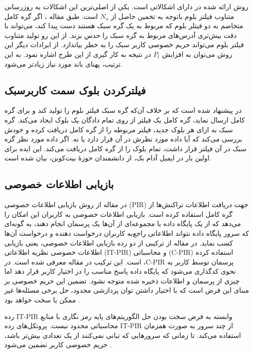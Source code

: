 روش ارائه شده در \cite{Kanemura2017} دارای اشکالاتی است. یکی از اصلی‌ترین این اشکالات به روزرسانی متناوب فیلتر بلوم باتوجه به تخمین حاصل از $N_u$  است. طبق مقاله \cite{Gervais2014}، اگر گره کامل متخاصم به دو فیتلر بلوم که مربوط به یک گره سبک هستند دست پیدا کند، می‌تواند با دقت بیش‌تری آدرس‌های مربوط به گره سبک را حدس بزند. از این رو تولید متناوب فیلتر بلوم می‌تواند حریم خصوصی کاربر سبک را به خطر بیاندازد.
از ایرادات دیگر این روش می‌توان به افزایش $P_t$ در نتیجه به کار گیری از این طرح اشاره نمود. به این ترتیب، پهنای باند مورد نیاز زیادتر می‌شود. 

\subsection{فیلترکردن بلوک سمت کاربرسبک}
\label{BIP157}
در \cite{Osuntokun2017} پیشنهاد شده است که بر خلاف آن‌که گره سبک فیلتر بلوم را تولید کند و برای گره کامل ارسال نماید، گره کامل یک فیلتر از روی تمام دادگان یک بلوک ایجاد می‌کند. گره سبک به ازای هر بلوک جدید، فیلتر مربوطه را از گره کامل دریافت کرده و خودش بررسی می‌کند که آیا داده مورد نظرش در آن قرار دارد یا نه. اگر داده مورد نظر گره سبک در آن فیلتر قرار داشت، تمام بلوک را از گره کامل دریافت می‌کند. این ایده برای اولین بار در ایمیل آدام بک، از دانشمندان حوزهٔ بیت‌کوین، بیان شده است.


\subsection{بازیابی اطلاعات خصوصی}
\label{PIR}
در مقاله \cite{Qin2019} از روش بازیابی اطلاعات خصوصی (PIR) جهت دریافت اطلاعات تراکنش‌ها از گره‌ کامل استفاده کرده است. بازیابی اطلاعات خصوصی به کاربران این امکان را می‌دهد که از یک پایگاه داده یا مجموعه‌ای از آن‌ها یک پرسمان انجام دهند، به گونه‌ای که سرور پایگاه داده نتواند اطلاعاتی راجع‌به کاربران درخواست دهنده و درخواست آن‌ها کسب نماید. در مقاله \cite{Qin2019}  از ترکیبی از دو رده بازیابی اطلاعات خصوصی، یعنی بازیابی اطلاعات خصوصی نظریه اطلاعاتی (IT-PIR) و محاسباتی (C-PIR) استفاده کرده است. این ترکیب در مقاله \cite{Devet2014} معرفی شده است. در ،C-PIR پرسمان توسط کاربر به نحوی کدگذاری می‌شود که پایگاه داده پاسخ مناسب را در اختیار کاربر قرار دهد اما چیزی از پرسمان و اطلاعات ذخیره شده متوجه نشود. تضمین این حریم خصوصی بر مبنای این فرض است که با اختیار داشتن توان پردازشی محدود، حل برخی مسئله‌ها  غیر ممکن یا سخت خواهد بود \cite{Devet2014}.

رده IT-PIR وابسته به فرض سخت بودن حل الگوریتم‌های پایه رمز نگاری با منابع محاسباتی محدود نیست. پروتکل‌های رده IT-PIR از چند سرور به صورت همزمان استفاده می‌کند. تا زمانی که سرورهایی که تبانی نمی‌کنند از یک تعدادی بیش‌تر باشد، حریم خصوصی کاربر تضمین می‌شود \cite{Devet2014}. 

